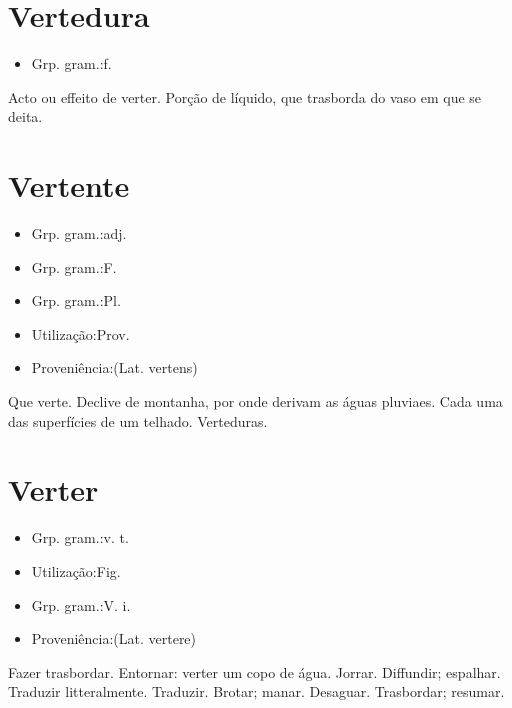 \documentclass{article}
\begin{document}
\section{Vertedura}
\begin{itemize}
\item {Grp. gram.:f.}
\end{itemize}
Acto ou effeito de verter.
Porção de líquido, que trasborda do vaso em que se deita.
\section{Vertente}
\begin{itemize}
\item {Grp. gram.:adj.}
\end{itemize}
\begin{itemize}
\item {Grp. gram.:F.}
\end{itemize}
\begin{itemize}
\item {Grp. gram.:Pl.}
\end{itemize}
\begin{itemize}
\item {Utilização:Prov.}
\end{itemize}
\begin{itemize}
\item {Proveniência:(Lat. \textunderscore vertens\textunderscore )}
\end{itemize}
Que verte.
Declive de montanha, por onde derivam as águas pluviaes.
Cada uma das superfícies de um telhado.
Verteduras.
\section{Verter}
\begin{itemize}
\item {Grp. gram.:v. t.}
\end{itemize}
\begin{itemize}
\item {Utilização:Fig.}
\end{itemize}
\begin{itemize}
\item {Grp. gram.:V. i.}
\end{itemize}
\begin{itemize}
\item {Proveniência:(Lat. \textunderscore vertere\textunderscore )}
\end{itemize}
Fazer trasbordar.
Entornar: \textunderscore verter um copo de água\textunderscore .
Jorrar.
Diffundir; espalhar.
Traduzir litteralmente.
Traduzir.
Brotar; manar.
Desaguar.
Trasbordar; resumar.
\end{document}
